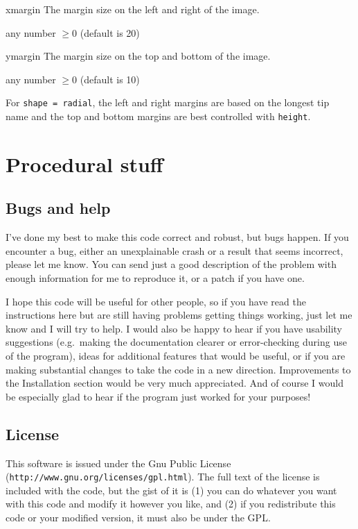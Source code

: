 \documentclass[10pt]{article}
\begin{document}
\begin{optdescrip}
	\item[xmargin] The margin size on the left and right of the image.
		\begin{valdescrip}
			\item[]  any number $\ge 0$ (default is 20)
		\end{valdescrip}

	\item[ymargin] The margin size on the top and bottom of the image.
		\begin{valdescrip}
			\item[]  any number $\ge 0$ (default is 10)
		\end{valdescrip}
\end{optdescrip}
For \texttt{shape = radial}, the left and right margins are based on the longest tip name and the top and bottom margins are best controlled with \texttt{height}.




\section*{Procedural stuff}

\subsection*{Bugs and help}

I've done my best to make this code correct and robust, but bugs happen.
If you encounter a bug, either an unexplainable crash or a result that seems incorrect, please let me know.
You can send just a good description of the problem with enough information for me to reproduce it, or a patch if you have one.

I hope this code will be useful for other people, so if you have read the instructions here but are still having problems getting things working, just let me know and I will try to help.
I would also be happy to hear if you have usability suggestions (e.g.\ making the documentation clearer or error-checking during use of the program), ideas for additional features that would be useful, or if you are making substantial changes to take the code in a new direction.
Improvements to the Installation section would be very much appreciated.
And of course I would be especially glad to hear if the program just worked for your purposes!

\subsection*{License}

This software is issued under the Gnu Public License (\texttt{http://www.gnu.org/licenses/gpl.html}).  The full text of the license is included with the code, but the gist of it is (1) you can do whatever you want with this code and modify it however you like, and (2) if you redistribute this code or your modified version, it must also be under the GPL.
\end{document}

